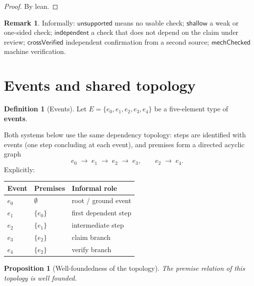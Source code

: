 \documentclass[11pt,a4paper]{article}
\theoremstyle{plain}
\newtheorem{proposition}[theorem]{Proposition}
\theoremstyle{definition}
\newtheorem{definition}[theorem]{Definition}
\newtheorem{remark}[theorem]{Remark}
\begin{document}
\begin{proof}
By lean.
\end{proof}

\begin{remark}
Informally: $\mathsf{unsupported}$ means no usable check;
$\mathsf{shallow}$ a weak or one-sided check;
$\mathsf{independent}$ a check that does not depend on the claim under
review; $\mathsf{crossVerified}$ independent confirmation from a second
source; $\mathsf{mechChecked}$ machine verification.
\end{remark}

\section{Events and shared topology}

\begin{definition}[Events]\label{def:evt}
Let $E = \{e_0, e_1, e_2, e_3, e_4\}$ be a five-element type of
\textbf{events}.
\end{definition}

Both systems below use the same dependency topology: steps are identified
with events (one step concluding at each event), and premises form a
directed acyclic graph
\begin{equation}
  e_0 \;\longrightarrow\; e_1 \;\longrightarrow\; e_2
  \;\longrightarrow\; e_3,
  \qquad
  e_2 \;\longrightarrow\; e_4.
\end{equation}
Explicitly:
\begin{center}
\begin{tabular}{lll}
\hline
Event & Premises & Informal role \\
\hline
$e_0$ & $\emptyset$ & root / ground event \\
$e_1$ & $\{e_0\}$ & first dependent step \\
$e_2$ & $\{e_1\}$ & intermediate step \\
$e_3$ & $\{e_2\}$ & claim branch \\
$e_4$ & $\{e_2\}$ & verify branch \\
\hline
\end{tabular}
\end{center}

\begin{proposition}[Well-foundedness of the topology]
The premise relation of this topology is well founded.
\end{proposition}
\end{document}
